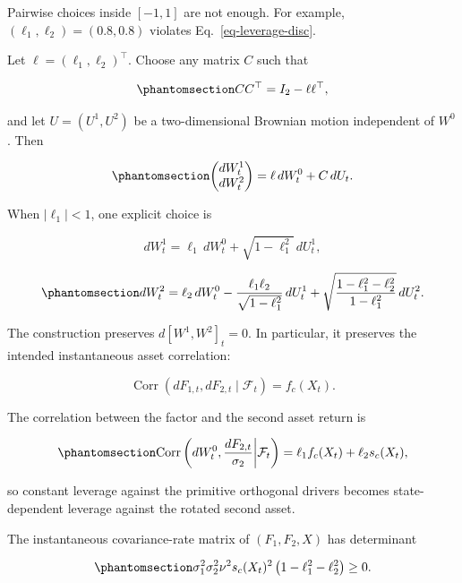 \documentclass[
  english,
  11pt,
  letterpaper,
  DIV=11,
  numbers=noendperiod]{scrartcl}
\theoremstyle{plain}
\theoremstyle{plain}
\theoremstyle{plain}
\theoremstyle{plain}
\theoremstyle{remark}
\begin{document}
Pairwise choices inside \([-1,1]\) are not enough. For example,
\((\ell_1,\ell_2)=(0.8,0.8)\) violates Eq.~\ref{eq-leverage-disc}.

Let \(\ell=(\ell_1,\ell_2)^\top\). Choose any matrix \(C\) such that

\begin{equation}\protect\phantomsection\label{eq-residual-root}{
CC^\top=I_2-\ell\ell^\top,
}\end{equation}

and let \(U=(U^1,U^2)\) be a two-dimensional Brownian motion independent
of \(W^0\). Then

\begin{equation}\protect\phantomsection\label{eq-orthogonal-decomposition}{
\begin{pmatrix}dW_t^1\\dW_t^2\end{pmatrix}
=\ell\,dW_t^0+C\,dU_t.
}\end{equation}

When \(|\ell_1|<1\), one explicit choice is

\[
dW_t^1
=\ell_1\,dW_t^0+\sqrt{1-\ell_1^2}\,dU_t^1,
\]

\begin{equation}\protect\phantomsection\label{eq-explicit-orthogonal}{
dW_t^2
=\ell_2\,dW_t^0
-\frac{\ell_1\ell_2}{\sqrt{1-\ell_1^2}}\,dU_t^1
+\sqrt{\frac{1-\ell_1^2-\ell_2^2}{1-\ell_1^2}}\,dU_t^2.
}\end{equation}

The construction preserves \(d[W^1,W^2]_t=0\). In particular, it
preserves the intended instantaneous asset correlation:

\[
\operatorname{Corr}(dF_{1,t},dF_{2,t}\mid\mathcal F_t)=f_c(X_t).
\]

The correlation between the factor and the second asset return is

\begin{equation}\protect\phantomsection\label{eq-state-dependent-second-leverage}{
\operatorname{Corr}
\left(
dW_t^0,\frac{dF_{2,t}}{\sigma_2}
\middle|\mathcal F_t
\right)
=\ell_1f_c(X_t)+\ell_2s_c(X_t),
}\end{equation}

so constant leverage against the primitive orthogonal drivers becomes
state-dependent leverage against the rotated second asset.

The instantaneous covariance-rate matrix of \((F_1,F_2,X)\) has
determinant

\begin{equation}\protect\phantomsection\label{eq-full-cov-determinant}{
\sigma_1^2\sigma_2^2\nu^2s_c(X_t)^2
\left(1-\ell_1^2-\ell_2^2\right)\ge0.
}\end{equation}
\end{document}
